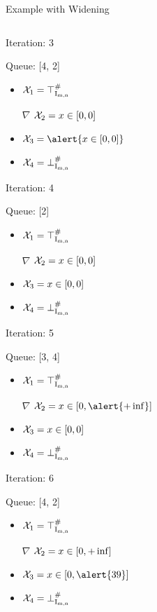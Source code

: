\documentclass{beamer}
\newcommand{\Intmn}{\textrm{I}_{\textrm{m,n}}}
\begin{document}
\begin{frame}{Example with Widening}
\begin{columns}[T]
\begin{column}{0.4\textwidth}
\begin{overprint}
                Iteration: 3

                Queue: [4, 2]

                \begin{itemize}
                    \item ${\cal{X}}_1 = \top^\#_{\Intmn}$
                    \item[$\nabla$] ${\cal{X}}_2 = x \in [0, 0]$
                    \item ${\cal{X}}_3 = \alert{x \in [0, 0]}$
                    \item ${\cal{X}}_4 = \bot^\#_{\Intmn}$
                \end{itemize}

                Iteration: 4

                Queue: [2]

                \begin{itemize}
                    \item ${\cal{X}}_1 = \top^\#_{\Intmn}$
                    \item[$\nabla$] ${\cal{X}}_2 = x \in [0, 0]$
                    \item ${\cal{X}}_3 = x \in [0, 0]$
                    \item ${\cal{X}}_4 = \bot^\#_{\Intmn}$
                \end{itemize}

                Iteration: 5

                Queue: [3, 4]

                \begin{itemize}
                    \item ${\cal{X}}_1 = \top^\#_{\Intmn}$
                    \item[$\nabla$] ${\cal{X}}_2 = x \in [0, \alert{+\inf}]$
                    \item ${\cal{X}}_3 = x \in [0, 0]$
                    \item ${\cal{X}}_4 = \bot^\#_{\Intmn}$
                \end{itemize}


                Iteration: 6

                Queue: [4, 2]

                \begin{itemize}
                    \item ${\cal{X}}_1 = \top^\#_{\Intmn}$
                    \item[$\nabla$] ${\cal{X}}_2 = x \in [0, +\inf]$
                    \item ${\cal{X}}_3 = x \in [0, \alert{39}]$
                    \item ${\cal{X}}_4 = \bot^\#_{\Intmn}$
                \end{itemize}



\end{overprint}
\end{column}
\end{columns}
\end{frame}
\end{document}
